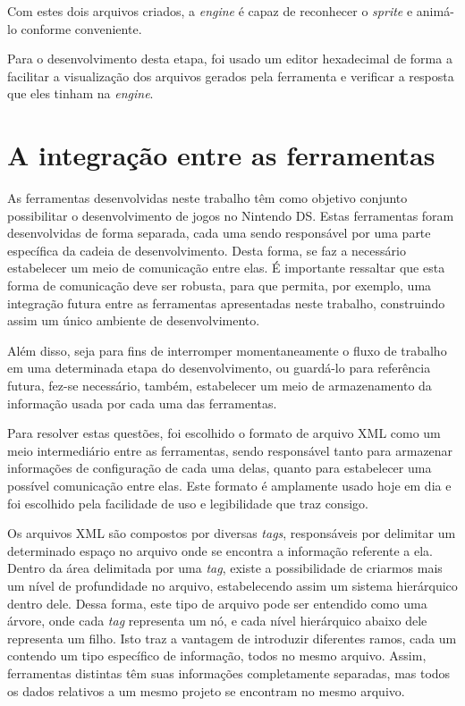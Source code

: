 \documentclass[brazil]{abnt}
\begin{document}
Com estes dois arquivos criados, a \textit{engine} é capaz de reconhecer o \textit{sprite} e animá-lo conforme conveniente. 



Para o desenvolvimento desta etapa, foi usado um editor hexadecimal de forma a facilitar a visualização dos arquivos gerados pela ferramenta e verificar a resposta que eles tinham na \textit{engine}.

\section{A integração entre as ferramentas\label{sec:xml}}

As ferramentas desenvolvidas neste trabalho têm como objetivo conjunto possibilitar o desenvolvimento de jogos no Nintendo DS. Estas ferramentas foram desenvolvidas de forma separada, cada uma sendo responsável por uma parte específica da cadeia de desenvolvimento. Desta forma, se faz a necessário estabelecer um meio de comunicação entre elas. É importante ressaltar que esta forma de comunicação deve ser robusta, para que permita, por exemplo, uma integração futura entre as ferramentas apresentadas neste trabalho, construindo assim um único ambiente de desenvolvimento. 

Além disso, seja para fins de interromper momentaneamente o fluxo de trabalho em uma determinada etapa do desenvolvimento, ou guardá-lo para referência futura, fez-se necessário, também, estabelecer um meio de armazenamento da informação usada por cada uma das ferramentas.

Para resolver estas questões, foi escolhido o formato de arquivo XML como um meio intermediário entre as ferramentas, sendo responsável tanto para armazenar informações de configuração de cada uma delas, quanto para estabelecer uma possível comunicação entre elas. Este formato é amplamente usado hoje em dia e foi escolhido pela facilidade de uso e legibilidade que traz consigo. 

Os arquivos XML são compostos por diversas \textit{tags}, responsáveis por delimitar um determinado espaço no arquivo onde se encontra a informação referente a ela. Dentro da área delimitada por uma \textit{tag}, existe a possibilidade de criarmos mais um nível de profundidade no arquivo, estabelecendo assim um sistema hierárquico dentro dele. Dessa forma, este tipo de arquivo pode ser entendido como uma árvore, onde cada \textit{tag} representa um nó, e cada nível hierárquico abaixo dele representa um filho. Isto traz a vantagem de introduzir diferentes ramos, cada um contendo um tipo específico de informação, todos no mesmo arquivo. Assim, ferramentas distintas têm suas informações completamente separadas, mas todos os dados relativos a um mesmo projeto se encontram no mesmo arquivo. 
\end{document}
